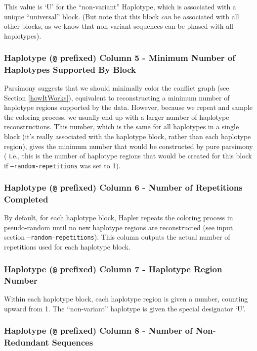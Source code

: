 \documentclass[11pt]{llncs}
\begin{document}
This value is `U' for the ``non-variant'' Haplotype, which is associated with a unique ``universal'' block. (But note that this block \emph{can} be 
associated with all other blocks, as we know that non-variant sequences can be phased with all haplotypes).

\subsubsection{Haplotype (\texttt{@} prefixed) Column 5 - Minimum Number of Haplotypes Supported By Block}

Parsimony suggests that we should minimally color the conflict graph (see Section \ref{howItWorks}), equivalent to reconstructing a 
minimum number of haplotype regions supported by the data. However, because we repeat and sample the coloring process, we usually
end up with a larger number of haplotype reconstructions. This number, which is the same for all haplotypes in a single block (it's really
associated with the haplotype block, rather than each haplotype region), gives the minimum number that would be constructed by pure parsimony (
i.e., this is the number of haplotype regions that would be created for this block if \texttt{--random-repetitions} was set to 1).

\subsubsection{Haplotype (\texttt{@} prefixed) Column 6 - Number of Repetitions Completed}

By default, for each haplotype block, Hapler repeats the coloring process in pseudo-random until no new haplotype regions are reconstructed
(see input section \texttt{--random-repetitions}). This column outputs the actual number of repetitions used for each haplotype block.

\subsubsection{Haplotype (\texttt{@} prefixed) Column 7 - Haplotype Region Number}

Within each haplotype block, each haplotype region is given a number, counting upward from 1. The ``non-variant'' haplotype is given the special
designator `U'.

\subsubsection{Haplotype (\texttt{@} prefixed) Column 8 - Number of Non-Redundant Sequences}
\end{document}
